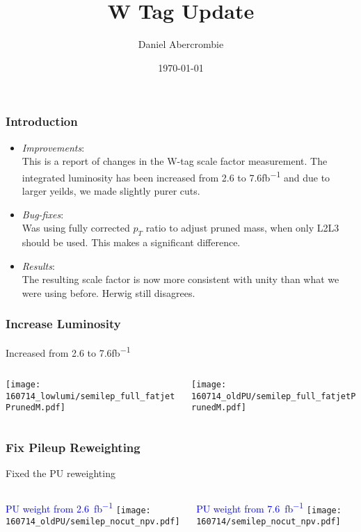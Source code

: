 \documentclass{beamer}
\author[D. Abercrombie]{
  Daniel Abercrombie
}
\title{\bf \sffamily W Tag Update}
\date{\today}
\begin{document}
\begin{frame}[nonumbering]
  \titlepage
\end{frame}

\begin{frame}
  \frametitle{Introduction}
  \begin{itemize}
  \item \emph{Improvements}: \\
    This is a report of changes in the W-tag scale factor measurement.
    The integrated luminosity has been increased from 2.6 to 7.6\si{fb^{-1}}
    and due to larger yeilds, we made slightly purer cuts.
  \item \emph{Bug-fixes}: \\
    Was using fully corrected $p_T$ ratio to adjust pruned mass, when only
    L2L3 should be used. This makes a significant difference.
  \item \emph{Results}: \\
    The resulting scale factor is now more consistent with unity than
    what we were using before.
    Herwig still disagrees.
  \end{itemize}
\end{frame}

\begin{frame}
  \frametitle{Increase Luminosity}
  Increased from 2.6 to 7.6\si{fb^{-1}}
  \vspace{12pt}
  \begin{columns}
    \begin{column}{0.5\linewidth}
      \texttt{[image: 160714\_lowlumi/semilep\_full\_fatjetPrunedM.pdf]}
    \end{column}
    \begin{column}{0.5\linewidth}
      \texttt{[image: 160714\_oldPU/semilep\_full\_fatjetPrunedM.pdf]}
    \end{column}
  \end{columns}
\end{frame}

\begin{frame}
  \frametitle{Fix Pileup Reweighting}
  Fixed the PU reweighting
  \vspace{12pt}
  \begin{columns}
    \begin{column}{0.5\linewidth}
      \centering
      \textcolor{blue}{PU weight from \SI{2.6}{fb^{-1}}}
      \texttt{[image: 160714\_oldPU/semilep\_nocut\_npv.pdf]}
    \end{column}
    \begin{column}{0.5\linewidth}
      \centering
      \textcolor{blue}{PU weight from \SI{7.6}{fb^{-1}}}
      \texttt{[image: 160714/semilep\_nocut\_npv.pdf]}
    \end{column}
  \end{columns}
\end{frame}
\end{document}
